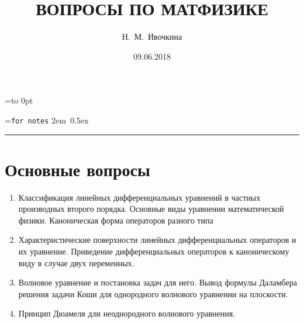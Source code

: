 \documentclass{trnotes}
\title{ВОПРОСЫ ПО МАТФИЗИКЕ \rlap{$\;$}}
\author{Н.~М.~Ивочкина}
\date{09.06.2018}
\def\sidenotestitle#1{
  \setbox \sidetitlebox=\vbox to 0pt{%
    \setbox0=\hbox{\texttt{#1}}
    \hbox{\kern 2em \unhcopy0\kern 0.5ex}\vskip2pt\hrule
  }%
  \hfill\box \sidetitlebox%
}
\let \olditem = \item
\let \oldlabelenumi=\labelenumi%
\newcommand{\importantitem}{%
  \renewcommand{\labelenumi}{$\to$ \textbf{\oldlabelenumi}}%
  \olditem
}
\renewcommand{\item}{%
  \renewcommand{\labelenumi}{\oldlabelenumi}%
  \olditem
}
\begin{document}
\maketitle
\sidenotestitle{for notes}
\vspace{-2\baselineskip}%
\section*{Основные вопросы}
\begin{enumerate}
  \importantitem  Классификация линейных дифференциальных уравнений в частных производных
  второго порядка. Основные виды уравнении математической физики.  Каноническая
  форма операторов разного типа

\item  Характеристические поверхности линейных дифференциальных операторов и их
  уравнение. Приведение дифференциальных операторов к каноническому виду в
  случае двух переменных.

\importantitem  Волновое уравнение и постановка задач для него. Вывод формулы Даламбера
  решения задачи Коши для однородного волнового уравнении на плоскости.
\item  Принцип Дюамеля дли неоднородного волнового уравнения.


\end{enumerate}
\end{document}
